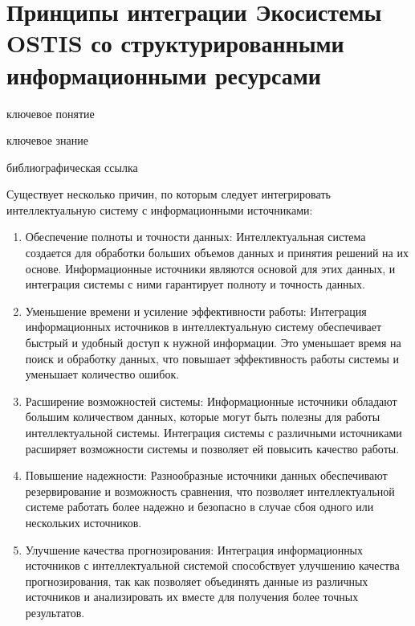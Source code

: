 \section{Принципы интеграции Экосистемы OSTIS со структурированными информационными ресурсами}
{\label{sec_integration_resources}} 

\begin{SCn}

    \bigskip
    
    \begin{scnrelfromlist}{ключевое понятие}
    \end{scnrelfromlist}
    
    \bigskip
    
    \begin{scnrelfromlist}{ключевое знание}
    \end{scnrelfromlist}
    
    \bigskip
    
    \begin{scnrelfromlist}{библиографическая ссылка}
    \end{scnrelfromlist}
    
    \end{SCn}

Существует несколько причин, по которым следует интегрировать интеллектуальную систему с информационными источниками:
\begin{enumerate}
    \item Обеспечение полноты и точности данных: Интеллектуальная система создается для обработки больших объемов данных и принятия решений на их основе. Информационные источники являются основой для этих данных, и интеграция системы с ними гарантирует полноту и точность данных.
    \item Уменьшение времени и усиление эффективности работы: Интеграция информационных источников в интеллектуальную систему обеспечивает быстрый и удобный доступ к нужной информации. Это уменьшает время на поиск и обработку данных, что повышает эффективность работы системы и уменьшает количество ошибок.
    \item Расширение возможностей системы: Информационные источники обладают большим количеством данных, которые могут быть полезны для работы интеллектуальной системы. Интеграция системы с различными источниками расширяет возможности системы и позволяет ей повысить качество работы.
    \item Повышение надежности: Разнообразные источники данных обеспечивают резервирование и возможность сравнения, что позволяет интеллектуальной системе работать более надежно и безопасно в случае сбоя одного или нескольких источников.
    \item Улучшение качества прогнозирования: Интеграция информационных источников с интеллектуальной системой способствует улучшению качества прогнозирования, так как позволяет объединять данные из различных источников и анализировать их вместе для получения более точных результатов.
\end{enumerate}

